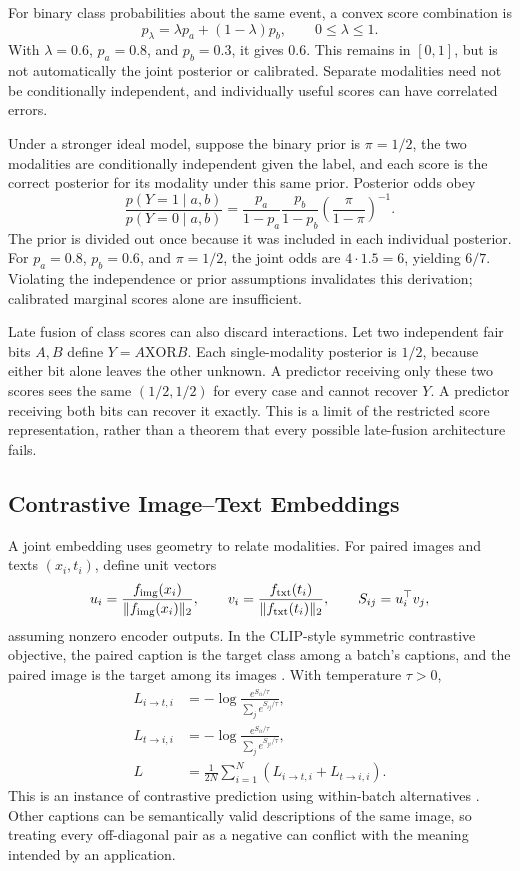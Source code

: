 For binary class probabilities about the same event, a convex score combination is
\[
 p_\lambda=\lambda p_a+(1-\lambda)p_b,\qquad0\le\lambda\le1.
\]
With $\lambda=0.6$, $p_a=0.8$, and $p_b=0.3$, it gives $0.6$. This remains in $[0,1]$, but is not automatically the joint posterior or calibrated. Separate modalities need not be conditionally independent, and individually useful scores can have correlated errors.

Under a stronger ideal model, suppose the binary prior is $\pi=1/2$, the two modalities are conditionally independent given the label, and each score is the correct posterior for its modality under this same prior. Posterior odds obey
\[
 \frac{p(Y=1\mid a,b)}{p(Y=0\mid a,b)}
 =\frac{p_a}{1-p_a}\frac{p_b}{1-p_b}
   \left(\frac{\pi}{1-\pi}\right)^{-1}.
\]
The prior is divided out once because it was included in each individual posterior. For $p_a=0.8$, $p_b=0.6$, and $\pi=1/2$, the joint odds are $4\cdot1.5=6$, yielding $6/7$. Violating the independence or prior assumptions invalidates this derivation; calibrated marginal scores alone are insufficient.

Late fusion of class scores can also discard interactions. Let two independent fair bits $A,B$ define $Y=A\mathbin{\mathrm{XOR}}B$. Each single-modality posterior is $1/2$, because either bit alone leaves the other unknown. A predictor receiving only these two scores sees the same $(1/2,1/2)$ for every case and cannot recover $Y$. A predictor receiving both bits can recover it exactly. This is a limit of the restricted score representation, rather than a theorem that every possible late-fusion architecture fails.

\subsection{Contrastive Image--Text Embeddings}

A joint embedding uses geometry to relate modalities. For paired images and texts $(x_i,t_i)$, define unit vectors
\[
 u_i=\frac{f_{\rm img}(x_i)}{\|f_{\rm img}(x_i)\|_2},\qquad
 v_i=\frac{f_{\rm txt}(t_i)}{\|f_{\rm txt}(t_i)\|_2},\qquad S_{ij}=u_i^\top v_j,
\]
assuming nonzero encoder outputs. In the CLIP-style symmetric contrastive objective, the paired caption is the target class among a batch's captions, and the paired image is the target among its images \citep{radford2021clip}. With temperature $\tau>0$,
\begin{align*}
 L_{i\to t,i}&=-\log\frac{e^{S_{ii}/\tau}}{\sum_j e^{S_{ij}/\tau}},\\
 L_{t\to i,i}&=-\log\frac{e^{S_{ii}/\tau}}{\sum_j e^{S_{ji}/\tau}},\\
 L&=\frac1{2N}\sum_{i=1}^{N}(L_{i\to t,i}+L_{t\to i,i}).
\end{align*}
This is an instance of contrastive prediction using within-batch alternatives \citep{oord2018cpc}. Other captions can be semantically valid descriptions of the same image, so treating every off-diagonal pair as a negative can conflict with the meaning intended by an application.

